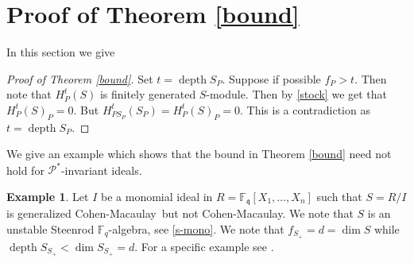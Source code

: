 \documentclass{amsart}
\newcommand{\CM}{Cohen-Macaulay}
\newcommand{\F}{\mathbb{F} }
\newcommand{\q}{\mathfrak{q} }
\newcommand{\Pc}{\mathcal{P} }
\newcommand{\depth}{\operatorname{depth}}
\theoremstyle{plain}
\theoremstyle{definition}
\newtheorem{example}[theorem]{Example}
\theoremstyle{remark}
\begin{document}
\section{Proof of Theorem \ref{bound}}
In this section we give
\begin{proof}[Proof of Theorem \ref{bound}]
Set $t = \depth S_P$.
Suppose if possible $f_P > t$. Then note that $H^t_P(S)$ is finitely generated $S$-module. Then by \ref{stock} we get that $H^t_P(S)_P = 0$.
But $H^t_{PS_P}(S_P) = H^t_P(S)_P = 0$. This is a  contradiction as $t = \depth S_P$.
\end{proof}
We give an example which shows that the bound in Theorem \ref{bound} need not hold for $\Pc^*$-invariant ideals.
\begin{example}\label{counter-bound}
  Let $I$ be a monomial ideal in $R = \F_\q[X_1, \ldots, X_n]$ such that $S = R/I$ is generalized \CM \ but not \CM. We note that $S$ is an unstable Steenrod 
  $\F_q$-algebra, see \ref{s-mono}. We note that $f_{S_+} = d = \dim S$ while $\depth S_{S_+} < \dim S_{S_+} = d$. For a specific example see \cite[3.5]{TY}.
\end{example}
\end{document}
